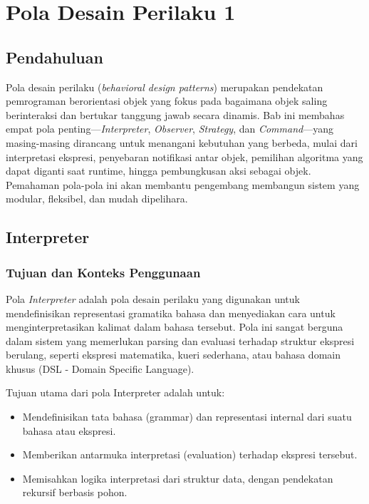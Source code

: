 \chapter{Pola Desain Perilaku 1}



\section{Pendahuluan}
Pola desain perilaku (\textit{behavioral design patterns}) merupakan pendekatan pemrograman berorientasi objek yang fokus pada bagaimana objek saling berinteraksi dan bertukar tanggung jawab secara dinamis. Bab ini membahas empat pola penting—\textit{Interpreter}, \textit{Observer}, \textit{Strategy}, dan \textit{Command}—yang masing-masing dirancang untuk menangani kebutuhan yang berbeda, mulai dari interpretasi ekspresi, penyebaran notifikasi antar objek, pemilihan algoritma yang dapat diganti saat runtime, hingga pembungkusan aksi sebagai objek. Pemahaman pola-pola ini akan membantu pengembang membangun sistem yang modular, fleksibel, dan mudah dipelihara.


\section{Interpreter}

\subsection{Tujuan dan Konteks Penggunaan}

Pola \textit{Interpreter} adalah pola desain perilaku yang digunakan untuk mendefinisikan representasi gramatika bahasa dan menyediakan cara untuk menginterpretasikan kalimat dalam bahasa tersebut. Pola ini sangat berguna dalam sistem yang memerlukan parsing dan evaluasi terhadap struktur ekspresi berulang, seperti ekspresi matematika, kueri sederhana, atau bahasa domain khusus (DSL - Domain Specific Language).

Tujuan utama dari pola Interpreter adalah untuk:
\begin{itemize}
	\item Mendefinisikan tata bahasa (grammar) dan representasi internal dari suatu bahasa atau ekspresi.
	\item Memberikan antarmuka interpretasi (evaluation) terhadap ekspresi tersebut.
	\item Memisahkan logika interpretasi dari struktur data, dengan pendekatan rekursif berbasis pohon.
\end{itemize}

